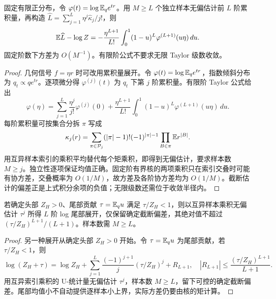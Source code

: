 \begin{theorem}[累积量截断的可控偏差]
固定有限正分布，令 $\varphi(t)=\log\mathbb E_qe^{tr}$。用 $M\ge L$ 个独立样本无偏估计前 $L$ 阶累积量，再构造 $\widehat L=\sum_{j=1}^L\eta^j\widehat\kappa_j/j!$，则
\begin{equation}
\mathbb E\widehat L-\log Z=-\frac{\eta^{L+1}}{L!}\int_0^1(1-u)^L\varphi^{(L+1)}(u\eta)\,du.
\end{equation}
固定阶数下方差为 $O(M^{-1})$。有限阶公式不要求无限 Taylor 级数收敛。
\end{theorem}
\begin{proof}
几何信号 $f=\eta r$ 时可改用累积量展开。令 $\varphi(t)=\log\mathbb E_qe^{tr}$，指数倾斜分布为 $q_t\propto qe^{tr}$。逐项微分得 $\varphi^{(j)}(t)$ 为 $q_t$ 下第 $j$ 阶累积量。有限阶 Taylor 公式给出
\begin{equation}
\varphi(\eta)=\sum_{j=1}^L\frac{\eta^j}{j!}\varphi^{(j)}(0)
+\frac{\eta^{L+1}}{L!}\int_0^1(1-u)^L\varphi^{(L+1)}(u\eta)\,du.
\end{equation}
每阶累积量可按集合分拆 $\pi$ 写成
\begin{equation}
\kappa_j(r)=\sum_{\pi\in\mathcal P_j}(|\pi|-1)!(-1)^{|\pi|-1}
\prod_{B\in\pi}\mathbb E r^{|B|}.
\end{equation}
用互异样本索引的乘积平均替代每个矩乘积，即得到无偏估计，要求样本数 $M\ge j$。独立性逐项保证均值正确。固定阶有界核的两项乘积只在索引交叠时可能有协方差，交叠概率为 $O(1/M)$，故方差及各阶协方差均为 $O(1/M)$。截断估计的偏差正是上式积分余项的负值；无限级数还需位于收敛半径内。
\end{proof}

\begin{proposition}[头部配分函数的尾部级数估计]
若确定头部 $Z_H>0$、尾部贡献 $\tau=\mathbb E_qu$ 满足 $\tau/Z_H<1$，则以互异样本乘积无偏估计 $\tau^j$ 所得 $L$ 阶 log 尾部展开，仅保留确定截断偏差，其绝对值不超过 $(\tau/Z_H)^{L+1}/(L+1)$。样本数需 $M\ge L$。
\end{proposition}
\begin{proof}
另一种展开从确定头部 $Z_H>0$ 开始。令 $\tau=\mathbb E_qu$ 为尾部贡献，若 $\tau/Z_H<1$，则
\begin{equation}
\log(Z_H+\tau)=\log Z_H+\sum_{j=1}^L\frac{(-1)^{j+1}}j(\tau/Z_H)^j+R_{L+1},
\quad |R_{L+1}|\le\frac{(\tau/Z_H)^{L+1}}{L+1}.
\end{equation}
用互异索引乘积的 U-统计量无偏估计 $\tau^j$，样本数 $M\ge L$，留下可控的确定截断偏差。尾部均值小不自动提供逐样本小上界，实际方差仍要由核的矩计算。
\end{proof}


